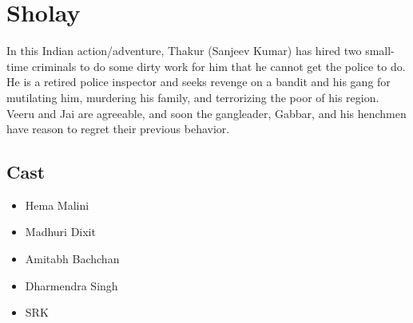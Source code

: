 \documentclass{article}
\begin{document}
\section{Sholay}
In this Indian action/adventure, Thakur (Sanjeev Kumar) has hired two small-time criminals to do some dirty work for him that he cannot get the police to do. He is a retired police inspector and seeks revenge on a bandit and his gang for mutilating him, murdering his family, and terrorizing the poor of his region. Veeru and Jai are agreeable, and soon the gangleader, Gabbar, and his henchmen have reason to regret their previous behavior.
\subsection{Cast}
\begin{itemize}
\item Hema Malini
\item Madhuri Dixit
\item Amitabh Bachchan
\item Dharmendra Singh
\item SRK
  \end{itemize}
\end{document}
